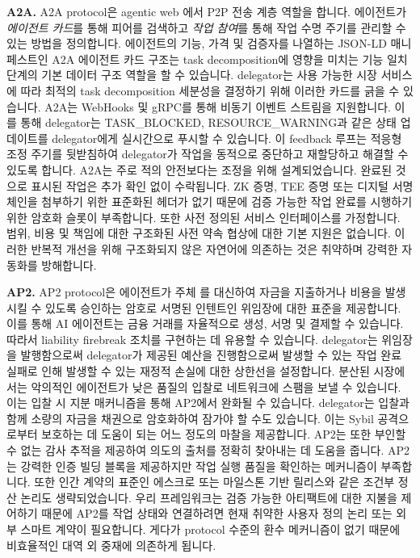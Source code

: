 \documentclass[11pt, a4paper, twocolumn, copyright, goog]{google}
\begin{document}
\textbf{A2A.} A2A protocol은 agentic web \citep{agent2agent}에서 P2P 전송 계층 역할을 합니다. 에이전트가 \emph{에이전트 카드}를 통해 피어를 검색하고 \emph{작업 참여}를 통해 작업 수명 주기를 관리할 수 있는 방법을 정의합니다. 에이전트의 기능, 가격 및 검증자를 나열하는 JSON-LD 매니페스트인 A2A 에이전트 카드 구조는 task decomposition에 영향을 미치는 기능 일치 단계의 기본 데이터 구조 역할을 할 수 있습니다. delegator는 사용 가능한 시장 서비스에 따라 최적의 task decomposition 세분성을 결정하기 위해 이러한 카드를 긁을 수 있습니다. A2A는 WebHooks 및 gRPC를 통해 비동기 이벤트 스트림을 지원합니다. 이를 통해 delegator는 TASK\_BLOCKED, RESOURCE\_WARNING과 같은 상태 업데이트를 delegator에게 실시간으로 푸시할 수 있습니다. 이 feedback 루프는 적응형 조정 주기를 뒷받침하여 delegator가 작업을 동적으로 중단하고 재할당하고 해결할 수 있도록 합니다. A2A는 주로 적의 안전보다는 조정을 위해 설계되었습니다. 완료된 것으로 표시된 작업은 추가 확인 없이 수락됩니다. ZK 증명, TEE 증명 또는 디지털 서명 체인을 첨부하기 위한 표준화된 헤더가 없기 때문에 검증 가능한 작업 완료를 시행하기 위한 암호화 슬롯이 부족합니다. 또한 사전 정의된 서비스 인터페이스를 가정합니다. 범위, 비용 및 책임에 대한 구조화된 사전 약속 협상에 대한 기본 지원은 없습니다. 이러한 반복적 개선을 위해 구조화되지 않은 자연어에 의존하는 것은 취약하며 강력한 자동화를 방해합니다.

\textbf{AP2.} AP2 protocol은 에이전트가 주체 \citep{parikh2025ap2}를 대신하여 자금을 지출하거나 비용을 발생시킬 수 있도록 승인하는 암호로 서명된 인텐트인 위임장에 대한 표준을 제공합니다. 이를 통해 AI 에이전트는 금융 거래를 자율적으로 생성, 서명 및 결제할 수 있습니다. 따라서 liability firebreak 조치를 구현하는 데 유용할 수 있습니다. delegator는 위임장을 발행함으로써 delegator가 제공된 예산을 진행함으로써 발생할 수 있는 작업 완료 실패로 인해 발생할 수 있는 재정적 손실에 대한 상한선을 설정합니다. 분산된 시장에서는 악의적인 에이전트가 낮은 품질의 입찰로 네트워크에 스팸을 보낼 수 있습니다. 이는 입찰 시 지분 매커니즘을 통해 AP2에서 완화될 수 있습니다. delegator는 입찰과 함께 소량의 자금을 채권으로 암호화하여 잠가야 할 수도 있습니다. 이는 Sybil 공격으로부터 보호하는 데 도움이 되는 어느 정도의 마찰을 제공합니다. AP2는 또한 부인할 수 없는 감사 추적을 제공하여 의도의 출처를 정확히 찾아내는 데 도움을 줍니다. AP2는 강력한 인증 빌딩 블록을 제공하지만 작업 실행 품질을 확인하는 메커니즘이 부족합니다. 또한 인간 계약의 표준인 에스크로 또는 마일스톤 기반 릴리스와 같은 조건부 정산 논리도 생략되었습니다. 우리 프레임워크는 검증 가능한 아티팩트에 대한 지불을 제어하기 때문에 AP2를 작업 상태와 연결하려면 현재 취약한 사용자 정의 논리 또는 외부 스마트 계약이 필요합니다. 게다가 protocol 수준의 환수 메커니즘이 없기 때문에 비효율적인 대역 외 중재에 의존하게 됩니다.
\end{document}
